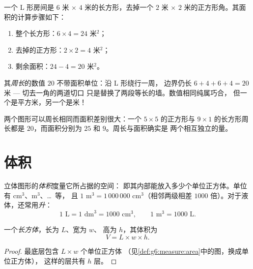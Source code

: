 \begin{example}[组合图形]\label{ex:g6:measure:composite}
一个 L 形房间是 $6$ 米 $\times$ $4$ 米的长方形，去掉一个 $2$ 米
$\times$ $2$ 米的正方形角。其面积的计算步骤如下：
\begin{enumerate}
  \item 整个长方形：$6 \times 4 = 24$ 米$^2$；
  \item 去掉的正方形：$2 \times 2 = 4$ 米$^2$；
  \item 剩余面积：$24 - 4 = 20$ 米$^2$。
\end{enumerate}
其\emph{周长}的数值 $20$ 不带面积单位：沿 L 形绕行一周，
边界仍长 $6 + 4 + 6 + 4 = 20$ 米 --- 切去一角的两道切口
只是替换了两段等长的墙。数值相同纯属巧合，
但一个是平方米，另一个是米！
\end{example}

\begin{remark}
两个图形可以周长相同而面积差别很大：一个
$5 \times 5$ 的正方形与 $9 \times 1$ 的长方形周长都是
$20$，而面积分别为 $25$ 和 $9$。周长与面积确实是
两个相互独立的量。
\end{remark}

\section{体积}

\begin{definition}[体积]\label{def:g6:measure:volume}
立体图形的\emph{体积}度量它所占据的空间：
即其内部能放入多少个单位正方体。单位有 cm$^3$、m$^3$、\dots\ 等，
且 $1$ m$^3 = 1\,000\,000$ cm$^3$（相邻两级相差
$1000$ 倍）。对于液体，还常用\emph{升}：
\[
1 \text{ L} = 1 \text{ dm}^3 = 1000 \text{ cm}^3,
\qquad
1 \text{ m}^3 = 1000 \text{ L}.
\]
\end{definition}

\begin{proposition}[长方体的体积]\label{prop:g6:measure:box}
一个\emph{长方体}，长为 $L$、宽为 $w$、
高为 $h$，其体积为
\[
V = L \times w \times h .
\]
\end{proposition}

\begin{proof}
最底层包含 $L \times w$ 个单位正方体
（见\cref{def:g6:measure:area}中的图，换成单位正方体），
这样的层共有 $h$ 层。
\end{proof}

